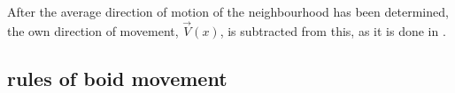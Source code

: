 \documentclass[a4paper, 10pt, journal]{wissarbIEEE}      %
\begin{document}
After the average direction of motion of the neighbourhood has been determined, the own direction of movement, $\vec{V}(x)$, is subtracted from this, as it is done in \cite{Reynolds99steeringbehaviors}.








\subsection{rules of boid movement}

\end{document}
